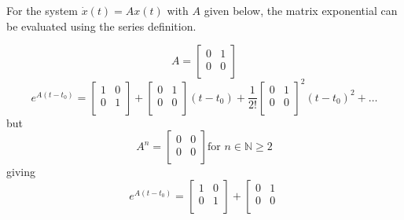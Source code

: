 \begin{example}
  For the system $\dot{x}(t)=Ax(t)$ with $A$ given below, the matrix exponential can be evaluated using the series definition.

  \begin{equation*}
    A=
    \left[
      \begin{array}{cc}
        0 & 1 \\
        0 & 0 \\
      \end{array}
    \right]
  \end{equation*}
  \begin{equation*}
    e^{A(t-t_{0})}=
    \left[
      \begin{array}{cc}
      1 & 0 \\
      0 & 1 \\
      \end{array}
    \right]+
    \left[
      \begin{array}{cc}
      0 & 1 \\
      0 & 0 \\
      \end{array}
    \right](t-t_{0})+\frac{1}{2!}
    \left[
      \begin{array}{cc}
      0 & 1 \\
      0 & 0 \\
      \end{array}
    \right]^{2}(t-t_{0})^{2}+\ldots
  \end{equation*}
  but
  \begin{equation*}
  A^{n}=
    \left[
      \begin{array}{cc}
      0 & 0 \\
      0 & 0 \\
      \end{array}
    \right] \text{for } n\in\mathbb{N}\geq2
  \end{equation*}
  giving
  \begin{equation*}
    e^{A(t-t_{0})}=
    \left[
    \begin{array}{cc}
      1 & 0 \\
      0 & 1 \\
    \end{array}
    \right]+
    \left[
    \begin{array}{cc}
      0 & 1 \\
      0 & 0 \\
    \end{array}

\end{equation*}
\end{example}
